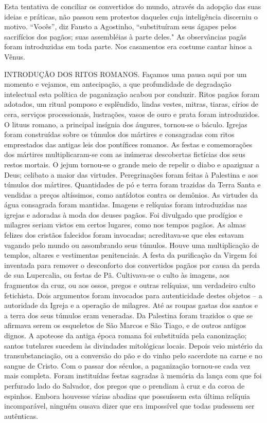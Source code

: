 \documentclass[11pt,a5paper,twoside,openany]{book}
\begin{document}
Esta tentativa de conciliar os convertidos do mundo, através da adopção das suas ideias e práticas, não passou sem protestos daqueles cuja inteligência discerniu o motivo. “Vocês”, diz Fausto a Agostinho, “substituíram seus ágapes pelos sacrifícios dos pagãos; suas assembléias à parte deles." As observâncias pagãs foram introduzidas em toda parte. Nos casamentos era costume cantar hinos a Vênus.

INTRODUÇÃO DOS RITOS ROMANOS. Façamos uma pausa aqui por um momento e vejamos, em antecipação, a que profundidade de degradação intelectual esta política de paganização acabou por conduzir. Ritos pagãos foram adotados, um ritual pomposo e esplêndido, lindas vestes, mitras, tiaras, círios de cera, serviços processionais, lustrações, vasos de ouro e prata foram introduzidos. O lituus romano, a principal insígnia dos áugures, tornou-se o báculo. Igrejas foram construídas sobre os túmulos dos mártires e consagradas com ritos emprestados das antigas leis dos pontífices romanos. As festas e comemorações dos mártires multiplicaram-se com as inúmeras descobertas fictícias dos seus restos mortais. O jejum tornou-se o grande meio de repelir o diabo e apaziguar a Deus; celibato a maior das virtudes. Peregrinações foram feitas à Palestina e aos túmulos dos mártires. Quantidades de pó e terra foram trazidas da Terra Santa e vendidas a preços altíssimos, como antídotos contra os demônios. As virtudes da água consagrada foram mantidas. Imagens e relíquias foram introduzidas nas igrejas e adoradas à moda dos deuses pagãos. Foi divulgado que prodígios e milagres seriam vistos em certos lugares, como nos tempos pagãos. As almas felizes dos cristãos falecidos foram invocadas; acreditava-se que eles estavam vagando pelo mundo ou assombrando seus túmulos. Houve uma multiplicação de templos, altares e vestimentas penitenciais. A festa da purificação da Virgem foi inventada para remover o desconforto dos convertidos pagãos por causa da perda de sua Lupercalia, ou festas de Pã. Cultivava-se o culto às imagens, aos fragmentos da cruz, ou aos ossos, pregos e outras relíquias, um verdadeiro culto fetichista. Dois argumentos foram invocados para autenticidade destes objetos – a autoridade da Igreja e a operação de milagres. Até as roupas gastas dos santos e a terra dos seus túmulos eram veneradas. Da Palestina foram trazidos o que se afirmava serem os esqueletos de São Marcos e São Tiago, e de outros antigos dignos. A apoteose da antiga época romana foi substituída pela canonização; santos tutelares sucedem às divindades mitológicas locais. Depois veio mistério da transubstanciação, ou a conversão do pão e do vinho pelo sacerdote na carne e no sangue de Cristo. Com o passar dos séculos, a paganização tornou-se cada vez mais completa. Foram instituídas festas sagradas à memória da lança com que foi perfurado lado do Salvador, dos pregos que o prendiam à cruz e da coroa de espinhos. Embora houvesse várias abadias que possuíssem esta última relíquia incomparável, ninguém ousava dizer que era impossível que todas pudessem ser autênticas.
\end{document}
